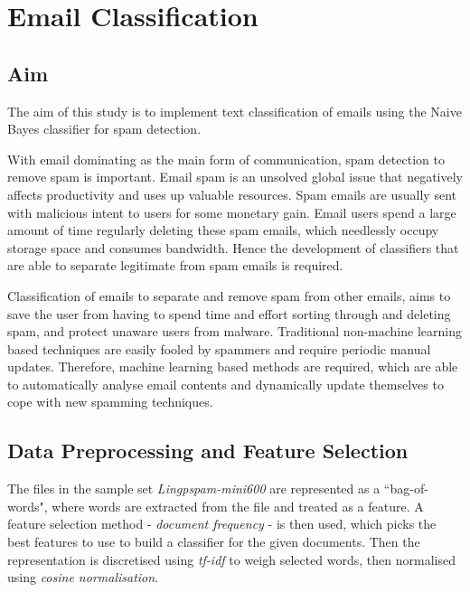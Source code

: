 \documentclass[10pt, a4paper]{article}
\begin{document}
\section{Email Classification}

\subsection*{Aim}

The aim of this study is to implement text classification of emails using the Naive Bayes classifier for spam detection.

With email dominating as the main form of communication, spam detection to remove spam is important. Email spam is an unsolved global issue that negatively affects productivity and uses up valuable resources. Spam emails are usually sent with malicious intent to users for some monetary gain. Email users spend a large amount of time regularly deleting these spam emails, which needlessly occupy storage space and consumes bandwidth. Hence the development of classifiers that are able to separate legitimate from spam emails is required. 

Classification of emails to separate and remove spam from other emails, aims to save the user from having to spend time and effort sorting through and deleting spam, and protect unaware users from malware. Traditional non-machine learning based techniques are easily fooled by spammers and require periodic manual updates. Therefore, machine learning based methods are required, which are able to automatically analyse email contents and dynamically update themselves to cope with new spamming techniques. 

\subsection*{Data Preprocessing and Feature Selection}
The files in the sample set \emph{Lingpspam-mini600} are represented as a ``bag-of-words", where words are extracted from the file and treated as a feature. A feature selection method - \emph{document frequency} - is then used, which picks the best features to use to build a classifier for the given documents. Then the representation is discretised using \emph{tf-idf} to weigh selected words, then normalised using \emph{cosine normalisation}. 
\end{document}
